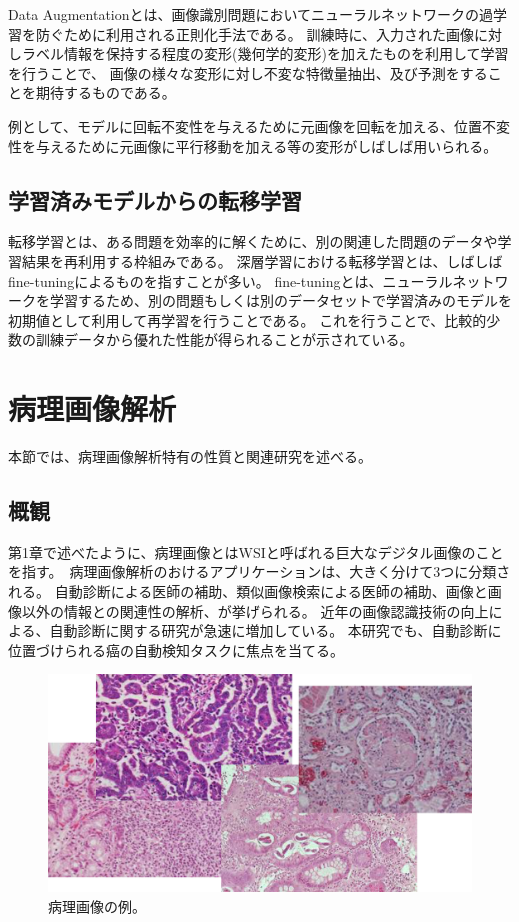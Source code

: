 Data Augmentationとは、画像識別問題においてニューラルネットワークの過学習を防ぐために利用される正則化手法である。
訓練時に、入力された画像に対しラベル情報を保持する程度の変形(幾何学的変形)を加えたものを利用して学習を行うことで、
画像の様々な変形に対し不変な特徴量抽出、及び予測をすることを期待するものである。

例として、モデルに回転不変性を与えるために元画像を回転を加える、位置不変性を与えるために元画像に平行移動を加える等の変形がしばしば用いられる。

\subsection{学習済みモデルからの転移学習}
転移学習とは、ある問題を効率的に解くために、別の関連した問題のデータや学習結果を再利用する枠組みである。
深層学習における転移学習とは、しばしばfine-tuningによるものを指すことが多い。
fine-tuningとは、ニューラルネットワークを学習するため、別の問題もしくは別のデータセットで学習済みのモデルを初期値として利用して再学習を行うことである。
これを行うことで、比較的少数の訓練データから優れた性能が得られることが示されている。

\section{病理画像解析}
本節では、病理画像解析特有の性質と関連研究を述べる。

\subsection{概観}
第1章で述べたように、病理画像とはWSIと呼ばれる巨大なデジタル画像のことを指す。\
病理画像解析のおけるアプリケーションは、大きく分けて3つに分類される\cite{komuraishikawa}。
自動診断による医師の補助、類似画像検索による医師の補助、画像と画像以外の情報との関連性の解析、が挙げられる。
近年の画像認識技術の向上による、自動診断に関する研究が急速に増加している。
本研究でも、自動診断に位置づけられる癌の自動検知タスクに焦点を当てる。

\begin{figure}[tbp]
    \label{fig:path_images}
     \begin{center}
      \includegraphics[width=13cm]{figures/path_images.png}
     \end{center}
    \caption{病理画像の例。}
\end{figure}
    
